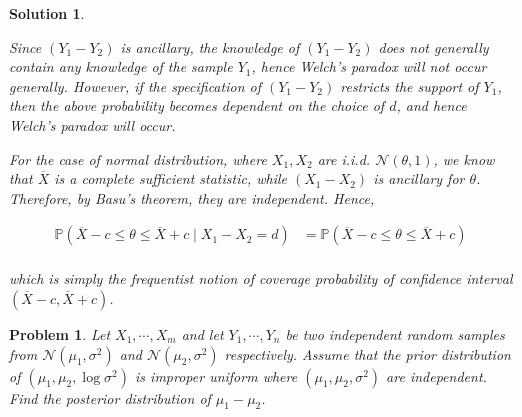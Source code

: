 \documentclass[12pt]{article}
\theoremstyle{problemstyle}
\newtheorem{pbm}{Problem}
\newtheorem*{solution*}{Solution}
\newenvironment{problem}{
\begin{tcolorbox}[colback=green!10!white,colframe=black!75!black, parbox = false]\begin{pbm} }{\end{pbm}\end{tcolorbox} }
\newcommand{\prob}{\mathbb{P}}
\newcommand{\normal}{\mathcal{N}}
\begin{document}
\begin{solution*}
\begin{enumerate}
    \noindent Since $(Y_1 - Y_2)$ is ancillary, the knowledge of $(Y_1 - Y_2)$ does not generally contain any knowledge of the sample $Y_1$, hence Welch's paradox will not occur generally. However, if the specification of $(Y_1 - Y_2)$ restricts the support of $Y_1$, then the above probability becomes dependent on the choice of $d$, and hence Welch's paradox will occur.

    For the case of normal distribution, where $X_1, X_2$ are i.i.d. $\normal(\theta, 1)$, we know that $\overline{X}$ is a complete sufficient statistic, while $(X_1 - X_2)$ is ancillary for $\theta$. Therefore, by Basu's theorem, they are independent. Hence,

    \begin{align*}
        \prob\left( \overline{X} - c \leq \theta \leq \overline{X} + c \mid X_1 - X_2 = d\right)
        & = \prob\left( \overline{X} - c \leq \theta \leq \overline{X} + c \right)\\
    \end{align*}

    which is simply the frequentist notion of coverage probability of confidence interval $(\overline{X} - c, \overline{X} + c)$.
    \end{enumerate}
\end{solution*}
\pagebreak



\begin{problem}
Let $X_1,\cdots, X_m$ and let $Y_1,\cdots, Y_n$ be two independent random samples from $\normal(\mu_1, \sigma^2)$ and $\normal(\mu_2, \sigma^2)$ respectively. Assume that the prior distribution of $(\mu_1, \mu_2, \log \sigma^2)$ is improper uniform where $(\mu_1, \mu_2, \sigma^2)$ are independent. Find the posterior distribution of $\mu_1-\mu_2$.
\end{problem}
\end{document}
